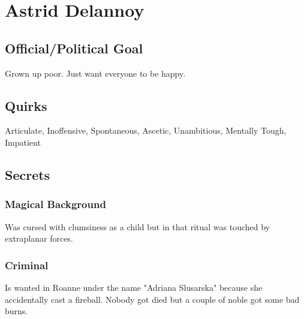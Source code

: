 \section*{Astrid Delannoy}

\subsection*{Official/Political Goal}
Grown up poor. Just want everyone to be happy.

\subsection*{Quirks}
Articulate, Inoffensive, Spontaneous, Ascetic, Unambitious, Mentally Tough, Impatient

\subsection*{Secrets}
\subsubsection*{Magical Background}
Was cursed with clumsiness as a child but in that ritual was touched by extraplanar forces.

\subsubsection*{Criminal}
Is wanted in Roanne under the name "Adriana Slusarska" because she accidentally cast a fireball. Nobody got died but a couple of noble got some bad burns. 